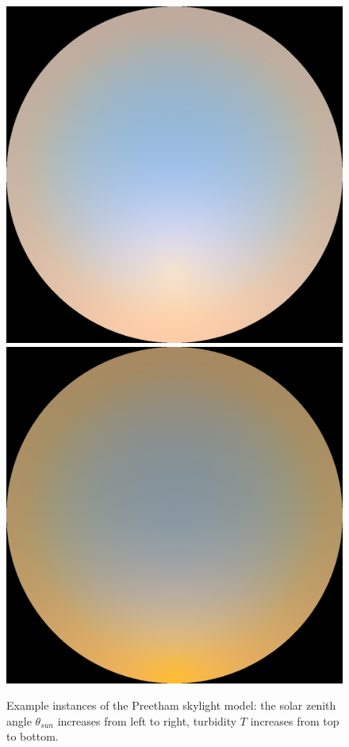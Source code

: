 \begin{figure}
{ }
 \hfill
 \subtop
 {
 \includegraphics[scale=0.125]{figures/preetham_sRGB_D65_turbidity_6_thetaSun_60.png}
 }
 \hfill
 \subtop
 {
 \includegraphics[scale=0.125]{figures/preetham_sRGB_D65_turbidity_6_thetaSun_90.png}
 }
\caption{
Example instances of the Preetham skylight model: the solar zenith angle
$\theta_{sun}$ increases from left to right, turbidity $T$ increases from top
to bottom.
}
\label{fig:preetham}
\end{figure}

